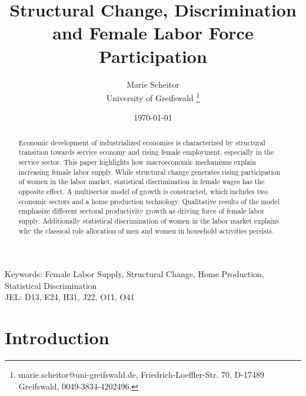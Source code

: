\documentclass[a4paper,12pt]{article}
\begin{document}
\begin{titlepage}

\title{Structural Change, Discrimination and Female Labor Force Participation}
\author{Marie Scheitor  \\
	University of Greifswald 
	\thanks{marie.scheitor@uni-greifswald.de,  Friedrich-Loeffler-Str. 70, D-17489 Greifswald, \newline \hspace*{0.6cm} 0049-3834-4202496.}}

\date{\today}

\end{titlepage}

\maketitle


\begin{abstract}
Economic development of industrialized economies is characterized by structural transition towards service economy and rising female employment, especially in the service sector. This paper highlights how macroeconomic mechanisms explain increasing female labor supply. While structural change generates rising participation of women in the labor market, statistical discrimination in female wages has the opposite effect. A multisector model of growth is constructed, which includes two economic sectors and a home production technology. Qualitative results of the model emphasize different sectoral productivity growth as driving force of female labor supply. Additionally statistical discrimination of women in the labor market explains why the classical role allocation of men and women in household activities persists.  
\end{abstract}

\vfill 
\noindent Keywords: Female Labor Supply, Structural Change, Home Production, Statistical \newline \hspace*{1.85cm} Discrimination\\


\noindent JEL: D13, E24, H31, J22, O11, O41

\thispagestyle{empty} \setcounter{page}{0}
\newpage

\section{Introduction}
\end{document}
